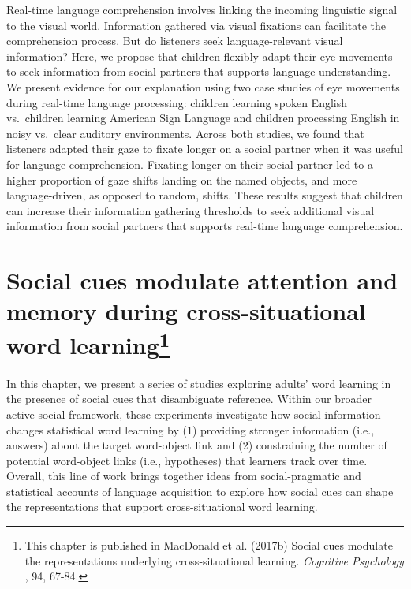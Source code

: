 \documentclass[oneside]{report}
\begin{document}
Real-time language comprehension involves linking the incoming
linguistic signal to the visual world. Information gathered via visual
fixations can facilitate the comprehension process. But do listeners
seek language-relevant visual information? Here, we propose that
children flexibly adapt their eye movements to seek information from
social partners that supports language understanding. We present
evidence for our explanation using two case studies of eye movements
during real-time language processing: children learning spoken English
vs.~children learning American Sign Language and children processing
English in noisy vs.~clear auditory environments. Across both studies,
we found that listeners adapted their gaze to fixate longer on a social
partner when it was useful for language comprehension. Fixating longer
on their social partner led to a higher proportion of gaze shifts
landing on the named objects, and more language-driven, as opposed to
random, shifts. These results suggest that children can increase their
information gathering thresholds to seek additional visual information
from social partners that supports real-time language comprehension.

\chapter[Social cues modulate attention and memory during
cross-situational word learning]{\texorpdfstring{Social cues modulate
attention and memory during cross-situational word learning\footnote{This
  chapter is published in MacDonald et al. (2017b) Social cues modulate
  the representations underlying cross-situational learning.
  \emph{Cognitive Psychology }, 94, 67-84.}}{Social cues modulate attention and memory during cross-situational word learning}}\label{social-cues-modulate-attention-and-memory-during-cross-situational-word-learning}


In this chapter, we present a series of studies exploring adults' word
learning in the presence of social cues that disambiguate reference.
Within our broader active-social framework, these experiments
investigate how social information changes statistical word learning by
(1) providing stronger information (i.e., answers) about the target
word-object link and (2) constraining the number of potential
word-object links (i.e., hypotheses) that learners track over time.
Overall, this line of work brings together ideas from social-pragmatic
and statistical accounts of language acquisition to explore how social
cues can shape the representations that support cross-situational word
learning.
\end{document}
